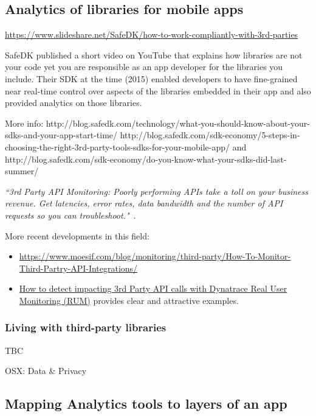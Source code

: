 \subsection{Analytics of libraries for mobile apps}
\url{https://www.slideshare.net/SafeDK/how-to-work-compliantly-with-3rd-parties}

SafeDK published a short video on YouTube that explains how libraries are not your code yet you are responsible as an app developer for the libraries you include. Their SDK at the time (2015) enabled developers to have fine-grained near real-time control over aspects of the libraries embedded in their app and also provided analytics on those libraries.

More info: 
http://blog.safedk.com/technology/what-you-should-know-about-your-sdks-and-your-app-start-time/
http://blog.safedk.com/sdk-economy/5-steps-in-choosing-the-right-3rd-party-tools-sdks-for-your-mobile-app/
and http://blog.safedk.com/sdk-economy/do-you-know-what-your-sdks-did-last-summer/

\emph{``3rd Party API Monitoring: Poorly performing APIs take a toll on your business revenue. Get latencies, error rates, data bandwidth and the number of API requests so you can troubleshoot."}~\citep{crittercism2015_homepage}.

More recent developments in this field:
\begin{itemize}
    \item \url{https://www.moesif.com/blog/monitoring/third-party/How-To-Monitor-Third-Partry-API-Integrations/}
    \item \href{https://www.dynatrace.com/news/blog/how-to-detect-impacting-3rd-party-api-calls-with-dynatrace-real-user-monitoring/}{How to detect impacting 3rd Party API calls with Dynatrace Real User Monitoring (RUM)} provides clear and attractive examples. 
\end{itemize}


\subsubsection{Living with third-party libraries}

TBC~\citep{huang2019_up_to_crash_3rdparty_libraries_on_android}


OSX: Data \& Privacy

\subsection{Mapping Analytics tools to layers of an app}

